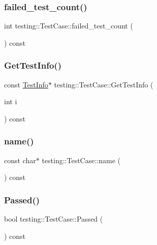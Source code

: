 \subsubsection{\texorpdfstring{failed\_test\_count()}{failed\_test\_count()}}
{\footnotesize\ttfamily int testing\+::\+Test\+Case\+::failed\+\_\+test\+\_\+count (\begin{DoxyParamCaption}{ }\end{DoxyParamCaption}) const}

\mbox{\label{classtesting_1_1_test_case_a12f5c93e69e5fecd08e4765baa331c58}} 
\subsubsection{\texorpdfstring{GetTestInfo()}{GetTestInfo()}}
{\footnotesize\ttfamily const \mbox{\hyperlink{classtesting_1_1_test_info}{Test\+Info}}$\ast$ testing\+::\+Test\+Case\+::\+Get\+Test\+Info (\begin{DoxyParamCaption}\item[{int}]{i }\end{DoxyParamCaption}) const}

\mbox{\label{classtesting_1_1_test_case_a3f1beb98d5f7e3b037a4ec82b64cc1cf}} 
\subsubsection{\texorpdfstring{name()}{name()}}
{\footnotesize\ttfamily const char$\ast$ testing\+::\+Test\+Case\+::name (\begin{DoxyParamCaption}{ }\end{DoxyParamCaption}) const\hspace{0.3cm}{\ttfamily [inline]}}

\mbox{\label{classtesting_1_1_test_case_a29bbfd227b732a90198b5280c039c271}} 
\subsubsection{\texorpdfstring{Passed()}{Passed()}}
{\footnotesize\ttfamily bool testing\+::\+Test\+Case\+::\+Passed (\begin{DoxyParamCaption}{ }\end{DoxyParamCaption}) const\hspace{0.3cm}{\ttfamily [inline]}}

